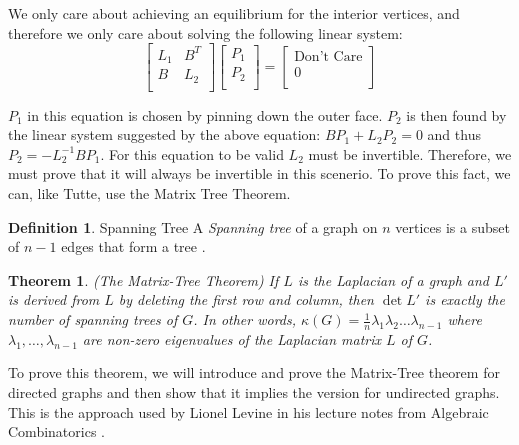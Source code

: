 \documentclass[11pt]{article}
\newtheorem{theorem}{Theorem}[section]
\theoremstyle{definition}
\newtheorem{definition}{Definition}[section]
\begin{document}
	We only care about achieving an equilibrium for the interior vertices, and therefore we only care about solving the following linear system:
		\begin{equation}
			\begin{bmatrix}
				L_1 & B^T \\
				B & L_2 \\
			\end{bmatrix}
			\begin{bmatrix}
			 	P_1 \\
    				P_2 \\
			\end{bmatrix}
			=
			\begin{bmatrix}
				\text{Don't Care} \\
				0 \\
			\end{bmatrix}
		\end{equation}
	
	$P_1$ in this equation is chosen by pinning down the outer face.
	$P_2$ is then found by the linear system suggested by the above equation: $BP_1 + L_2P_2 = 0$ and thus $P_2 = -L_2^{-1}BP_1$. 
	For this equation to be valid $L_2$ must be invertible. Therefore, we must prove that it will always be invertible in this scenerio.
	To prove this fact, we can, like Tutte, use the Matrix Tree Theorem.
	
	\theoremstyle{definition}
	\begin{definition}{Spanning Tree}
		A \emph{Spanning tree} of a graph on $n$ vertices is a subset of $n-1$ edges that form a tree \cite{mathworld:SpanningTree}.
	\end{definition}
	
	\begin{theorem}{(The Matrix-Tree Theorem)}
		If $L$ is the Laplacian of a graph and $L'$ is derived from $L$ by deleting the first row and column, then $\det L'$ is exactly the number of spanning trees of $G$.
		In other words, $\kappa(G) = \frac{1}{n} \lambda_1\lambda_2 \dots \lambda_{n-1}$ where $\lambda_1, \dots, \lambda_{n-1}$ are non-zero eigenvalues of the Laplacian matrix $L$ of $G$.
	\end{theorem}
	
	To prove this theorem, we will introduce and prove the Matrix-Tree theorem for directed graphs and then show that it implies the version for undirected graphs.
	This is the approach used by Lionel Levine in his lecture notes from Algebraic Combinatorics \cite{matrixTree}.
	
\end{document}
